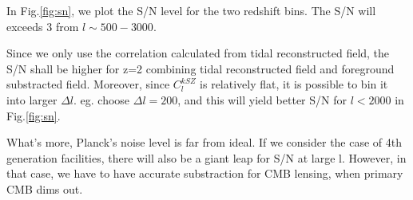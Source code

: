 In Fig.\ref{fig:sn}, we plot the S/N level for the two redshift bins. 
The S/N will exceeds 3 from $l\sim 500-3000$. 

Since we only use the correlation calculated from tidal reconstructed field, the S/N shall be higher for z=2  
combining tidal reconstructed field and foreground substracted field. 
Moreover, since $C_l^{kSZ}$ is relatively flat, 
it is possible to bin it into larger $\Delta l$. 
eg. \cite{Hill16} choose $\Delta l=200$, and this will yield better S/N for $l<2000$ in Fig.\ref{fig:sn}.

What's more, Planck's noise level is far from ideal. If we consider the case of 4th generation facilities, there will also be a giant leap for S/N at large l. 
However, in that case, we have to have accurate substraction for CMB lensing, 
when primary CMB dims out.
